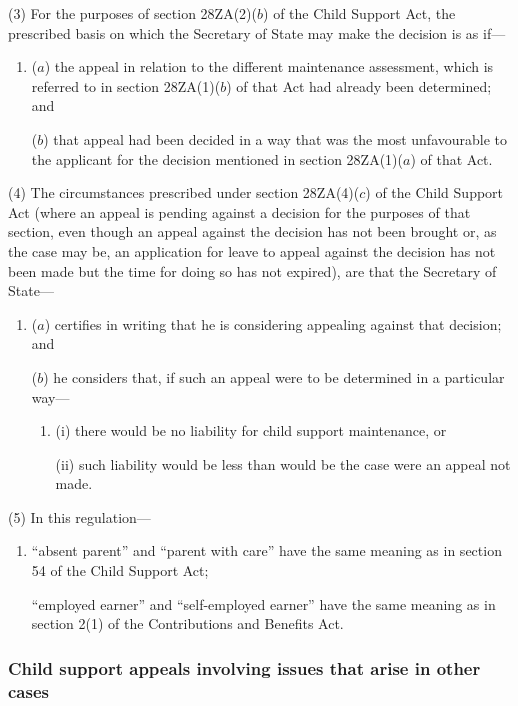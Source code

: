 \documentclass[12pt,a4paper]{article}
\begin{document}
(3) For the purposes of section 28ZA(2)($b$) of the Child Support Act, the prescribed basis on which the Secretary of State may make the decision is as if—
\begin{enumerate}\item[]
($a$) the appeal in relation to the different maintenance assessment, which is referred to in section 28ZA(1)($b$) of that Act had already been determined; and

($b$) that appeal had been decided in a way that was the most unfavourable to the applicant for the decision mentioned in section 28ZA(1)($a$) of that Act.
\end{enumerate}

(4) The circumstances prescribed under section 28ZA(4)($c$) of the Child Support Act (where an appeal is pending against a decision for the purposes of that section, even though an appeal against the decision has not been brought or, as the case may be, an application for leave to appeal against the decision has not been made but the time for doing so has not expired), are that the Secretary of State—
\begin{enumerate}\item[]
($a$) certifies in writing that he is considering appealing against that decision; and

($b$) he considers that, if such an appeal were to be determined in a particular way—
\begin{enumerate}\item[]
(i) there would be no liability for child support maintenance, or

(ii) such liability would be less than would be the case were an appeal not made.
\end{enumerate}
\end{enumerate}

(5) In this regulation—
\begin{enumerate}\item[]
“absent parent” and “parent with care” have the same meaning as in section 54 of the Child Support Act;

“employed earner” and “self-employed earner” have the same meaning as in section 2(1) of the Contributions and Benefits Act.
\end{enumerate}

\subsubsection[24. Child support appeals involving issues that arise in other cases]{Child support appeals involving issues that arise in other cases}
\end{document}

